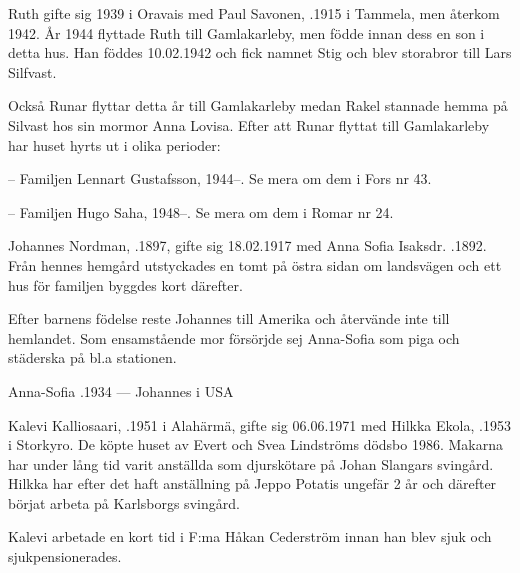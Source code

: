 Ruth gifte sig 1939 i Oravais med  Paul Savonen, .1915 i Tammela, men återkom 1942. År 1944 flyttade Ruth till Gamlakarleby, men födde innan dess en son i detta hus. Han föddes 10.02.1942 och fick namnet Stig och blev storabror till Lars Silfvast.

Också Runar flyttar detta år till Gamlakarleby medan Rakel stannade hemma på Silvast hos sin mormor Anna Lovisa. Efter att Runar flyttat till Gamlakarleby har huset hyrts ut i olika perioder:

-- Familjen Lennart Gustafsson, 1944--. Se mera om dem i Fors nr 43.

-- Familjen Hugo Saha, 1948--. Se mera om dem i Romar nr 24.


Johannes Nordman, .1897, gifte sig 18.02.1917 med Anna Sofia Isaksdr. .1892. Från hennes hemgård utstyckades en tomt på östra sidan om landsvägen och ett hus för familjen byggdes kort därefter.

Efter barnens födelse reste Johannes till Amerika och återvände inte till hemlandet. Som ensamstående mor försörjde sej Anna-Sofia som piga och städerska på bl.a stationen.
\begin{jhchildren}
  \item {}
  \item {}
  \item {}
\end{jhchildren}

Anna-Sofia .1934  ---  Johannes   i USA





Kalevi Kalliosaari, .1951 i Alahärmä, gifte sig 06.06.1971 med Hilkka Ekola, .1953 i Storkyro. De köpte huset av Evert och Svea Lindströms dödsbo 1986. Makarna har under lång tid varit anställda som djurskötare på Johan Slangars svingård. Hilkka har efter det haft anställning på Jeppo Potatis ungefär 2 år och därefter börjat arbeta på Karlsborgs svingård.

Kalevi arbetade en kort tid i F:ma Håkan Cederström innan han blev sjuk och sjukpensionerades.
\begin{jhchildren}
  \item {}
  \item {}
  \item {}
\end{jhchildren}


